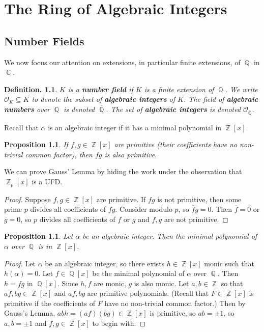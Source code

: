 \documentclass[11pt, a4paper]{memoir}
\DeclareMathOperator{\Q}{{\mathbb{Q}}}
\DeclareMathOperator{\Z}{{\mathbb{Z}}}
\DeclareMathOperator{\C}{{\mathbb{C}}}
\theoremstyle{change}
\newtheorem{proposition}[theorem]{Proposition}
\theoremstyle{plain}
\theoremstyle{nonumberplain}
\newtheorem{definition}{Definition.}
\newtheorem{proof}{Proof}
\begin{document}
\chapter{The Ring of Algebraic Integers}
\section{Number Fields}
We now focus our attention on extensions, in particular finite extensions, of $\Q$ in $\C$.
\begin{definition}
    $K$ is a \textbf{number field} if $K$ is a finite extension of $\Q$.
    We write $\mathcal{O}_K\subseteq K$ to denote the subset of \textbf{algebraic integers} of $K$.
    The field of \textbf{algebraic numbers} over $\Q$ is denoted $\overline{\Q}$.
    The set of \textbf{algebraic integers} is denoted $\mathcal{O}_{\overline{\Q}}$.
\end{definition}
Recall that $\alpha$ is an algebraic integer if it has a minimal polynomial in $\Z[x]$.
\begin{proposition}
    If $f,g\in\Z[x]$ are primitive (their coefficients have no non-trivial common factor), then $fg$ is also primitive.
\end{proposition}
We can prove Gauss' Lemma by hiding the work under the observation that $\Z_p[x]$ is a UFD.
\begin{proof}
    Suppose $f,g\in\Z[x]$ are primitive.
    If $fg$ is not primitive, then some prime $p$ divides all coefficients of $fg$.
    Consider modulo $p$, so $\overline{f}\overline{g}=0$.
    Then $\overline{f}=0$ or $\overline{g}=0$, so $p$ divides all coefficients of $f$ or $g$ and $f,g$ are not primitive.
\end{proof}
\begin{proposition}
    Let $\alpha$ be an algebraic integer.
    Then the minimal polynomial of $\alpha$ over $\Q$ is in $\Z[x]$.
\end{proposition}
\begin{proof}
    Let $\alpha$ be an algebraic integer, so there exists $h\in\Z[x]$ monic such that $h(\alpha)=0$.
    Let $f\in\Q[x]$ be the minimal polynomial of $\alpha$ over $\Q$.
    Then $h=fg$ in $\Q[x]$.
    Since $h,f$ are monic, $g$ is also monic.
    Let $a,b\in\Z$ so that $af,bg\in\Z[x]$ and $af,bg$ are primitive polynomials.
    (Recall that $F\in\Z[x]$ is primitive if the coefficients of $F$ have no non-trivial common factor.)
    Then by Gauss's Lemma, $abh=(af)(bg)\in\Z[x]$ is primitive, so $ab=\pm1$, so $a,b=\pm1$ and $f,g\in\Z[x]$ to begin with.
\end{proof}
\end{document}
